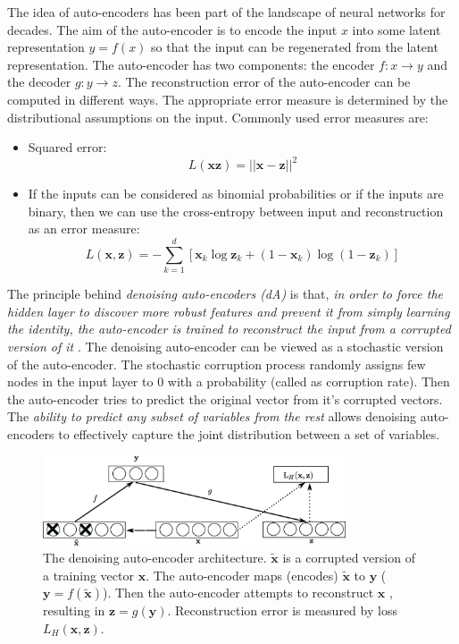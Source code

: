 The idea of auto-encoders has been part of the landscape of neural networks for decades.  The aim of the auto-encoder is to encode the input $x$ into some latent representation $y = f(x)$ so that the input can be regenerated from the latent representation.  The auto-encoder has two components: the encoder $f:x \rightarrow y$ and the decoder $g:y \rightarrow z$.  The reconstruction error of the auto-encoder can be computed in different ways.  The appropriate error measure is determined by the distributional assumptions on the input.  Commonly used error measures are:
\begin{itemize}
\item Squared error:
$$ L(\mathbf{x} \mathbf{z}) = || \mathbf{x} - \mathbf{z} ||^2$$
\item If the inputs can be considered as binomial probabilities or if the inputs are binary, then we can use the cross-entropy between input and reconstruction as an error measure:
$$L(\mathbf{x}, \mathbf{z}) = - \sum^d_{k=1}[\mathbf{x}_k \log \mathbf{z}_k + (1 - \mathbf{x}_k)\log(1 - \mathbf{z}_k)]$$
\end{itemize}

The principle behind \emph{denoising auto-encoders (dA)} is that, \textit{in order to force the hidden layer to discover more robust features and prevent it from simply learning the identity, the auto-encoder is trained to reconstruct the input from a corrupted version of it} \cite{vincent2008extracting}.  The denoising auto-encoder can be viewed as a stochastic version of the auto-encoder.  The stochastic corruption process randomly assigns few nodes in the input layer to $0$ with a probability (called as corruption rate).  Then the auto-encoder tries to predict the original vector from it's corrupted vectors.  The \textit{ability to predict any subset of variables from the rest} allows denoising auto-encoders to effectively capture the joint distribution between a set of variables.

\begin{figure}[ht]
\centering
\includegraphics[width=0.8\textwidth]{./imgs/sda.eps}
\caption[The denoising auto-encoder architecture]{The denoising auto-encoder architecture. $\mathbf{\tilde{x}}$ is a corrupted version of a training vector $\mathbf{x}$.  The auto-encoder maps (encodes) $\mathbf{\tilde{x}}$ to $\mathbf{y}$ ($\mathbf{y} = f(\mathbf{\tilde{x}})$).  Then the auto-encoder attempts to reconstruct $\mathbf{x}$ , resulting in $ \mathbf{z} = g(\mathbf{y}) $. Reconstruction error is measured by loss $L_{H}(\mathbf{x},\mathbf{z})$. }
\label{fig:sdaChain}
\end{figure}

